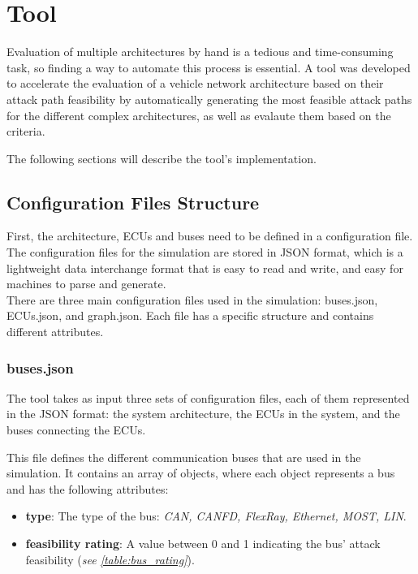 \chapter{Tool}
\label{chp:tool}

Evaluation of multiple architectures by hand is a tedious and time-consuming task, so finding a way to automate this process is essential.
A tool was developed to accelerate the evaluation of a vehicle network architecture based on their attack path feasibility
by automatically generating the most feasible attack paths for the different complex architectures, as well as evalaute them based on the criteria.

The following sections will describe the tool's implementation.

\section{Configuration Files Structure}
\label{sec:config}

First, the architecture, ECUs and buses need to be defined in a configuration file.
The configuration files for the simulation are stored in JSON format, 
which is a lightweight data interchange format that is easy to read and write, and easy for machines to parse and generate.\\

There are three main configuration files used in the simulation: buses.json, ECUs.json, and graph.json.
Each file has a specific structure and contains different attributes.

\subsection{buses.json}
\label{sec:buses}

The tool takes as input three sets of configuration files, each of them represented in the JSON format: 
the system architecture, the ECUs in the system, and the buses connecting the ECUs. 

This file defines the different communication buses that are used in the simulation. 
It contains an array of objects, where each object represents a bus and has the following attributes:

\begin{itemize}
\item \textbf{type}: The type of the bus: \textit{CAN, CANFD, FlexRay, Ethernet, MOST, LIN}.
\item \textbf{feasibility rating}: A value between 0 and 1 indicating the bus' attack feasibility (\textit{see \ref{table:bus_rating}}).
\end{itemize}

